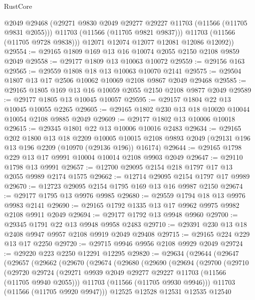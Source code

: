\begin{lexlean}{RustCore}
\begin{coremodule}
            @2049
            @29468
            (@29271 @9830 @2049 @29277 @29227 @11703 (@11566 (@11705 @9831 @2055)))
            @11703
            (@11566 (@11705 @9821 @9837)))
          @11703
          (@11566 (@11705 @9728 @9838)))
        @12071
        @12074
        @12077
        @12081
        @12086
        @12092))
@29554 := @29165 @1809 @169 @13 @16 @10074 @2055 @2150 @2108 @9859 @2049
@29558 := @29177 @1809 @13 @10063 @10072
@29559 := @29156 @163
@29565 := @29559 @1808 @18 @13 @10063 @10070 @2141
@29575 := @29504 @1807 @13 @17 @2506 @10062 @10069 @2108 @9867 @2049 @29468
@29585 := @29165 @1805 @169 @13 @16 @10059 @2055 @2150 @2108 @9877 @2049
@29589 := @29177 @1805 @13 @10045 @10057
@29595 := @29157 @1804 @22 @13 @10045 @10055 @2265
@29605 := @29165 @1802 @230 @13 @18 @10020 @10044 @10054 @2108 @9885 @2049
@29609 := @29177 @1802 @13 @10006 @10018
@29615 := @29345 @1801 @22 @13 @10006 @10016 @2483
@29634 := @29165
    @202
    @1800
    @13
    @18
    @2209
    @10005
    @10015
    @2108
    @9893
    @2049
    (@29131 @196 @13 @196 @2209 (@10970 (@29136 @196)) @16174)
@29644 := @29165 @1798 @229 @13 @17 @9991 @10004 @10014 @2108 @9903 @2049
@29647 := @29110 @1798 @13 @9991
@29657 := @12700 @29095 @2154 @218 @1797 @17 @13 @2055 @9989 @2174 @1575
@29662 := @12714 @29095 @2154 @1797 @17 @9989
@29670 := @12723 @29095 @2154 @1795 @169 @13 @16 @9987 @2150
@29674 := @29177 @1795 @13 @9976 @9985
@29680 := @29559 @1794 @18 @13 @9976 @9983 @2141
@29690 := @29165 @1792 @1335 @13 @17 @9962 @9975 @9982 @2108 @9911 @2049
@29694 := @29177 @1792 @13 @9948 @9960
@29700 := @29345 @1791 @22 @13 @9948 @9958 @2483
@29710 := @29391 @230 @13 @18 @2408 @9947 @9957 @2108 @9919 @2049 @29408
@29715 := @29165 @224 @229 @13 @17 @2250
@29720 := @29715 @9946 @9956 @2108 @9929 @2049
@29724 := @29220 @223 @2250 @12291 @12295
@29820 := @29634
    (@29644
      (@29647
        (@29657
          (@29662
            (@29670
              (@29674
                (@29680
                  (@29690
                    (@29694
                      (@29700
                        (@29710
                          (@29720
                            @29724
                            (@29271 @9939 @2049 @29277 @29227 @11703 (@11566 (@11705 @9940 @2055)))
                            @11703
                            (@11566 (@11705 @9930 @9946)))
                          @11703
                          (@11566 (@11705 @9920 @9947)))
                        @12525
                        @12528
                        @12531
                        @12535
                        @12540

\end{coremodule}
\end{lexlean}
